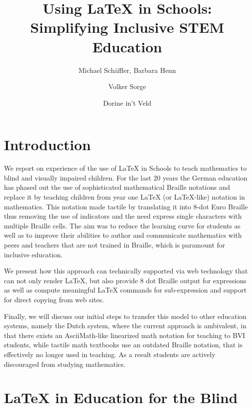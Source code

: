 \documentclass{article}
\begin{document}
\title{Using {\LaTeX} in Schools: Simplifying Inclusive STEM Education}

\author[1]{Michael Schäffler, Barbara Henn}

\author[2]{Volker Sorge}

\author[3]{Dorine in't Veld}

\date{}
\maketitle


\section{Introduction}\label{sec:intro}

We report on experience of the use of {\LaTeX} in Schools to teach mathematics to
blind and visually impaired children. For the last 20 years the German education
has phased out the use of sophisticated mathematical Braille notations and
replace it by teaching children from year one {\LaTeX} (or {\LaTeX}-like) notation in
mathematics. This notation made tactile by translating it into 8-dot Euro
Braille thus removing the use of indicators and the need express single
characters with multiple Braille cells. The aim was to reduce the learning curve
for students as well as to improve their abilities to author and communicate
mathematics with peers and teachers that are not trained in Braille, which is
paramount for inclusive education.

We present how this approach can technically supported via web technology that
can not only render {\LaTeX}, but also provide 8 dot Braille output for expressions
as well as compute meaningful {\LaTeX} commands for sub-expression and support for
direct copying from web sites.

Finally, we will discuss our initial steps to transfer this model to other
education systems, namely the Dutch system, where the current approach is
ambivalent, in that there exists an AsciiMath-like linearized math notation for
teaching to BVI students, while tactile math textbooks use an outdated Braille
notation, that is effectively no longer used in teaching.  As a result students
are actively discouraged from studying mathematics.

\section{{\LaTeX} in Education for the Blind}\label{sec:latex-in-schools}
\end{document}

